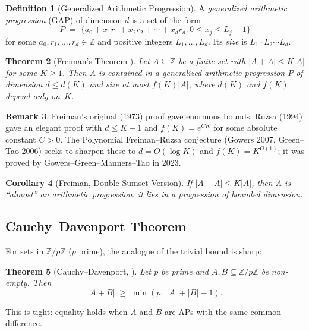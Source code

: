 \documentclass[12pt,a4paper]{amsart}
\newtheorem{theorem}{Theorem}[section]
\newtheorem{corollary}[theorem]{Corollary}
\theoremstyle{definition}
\newtheorem{definition}[theorem]{Definition}
\newtheorem{remark}[theorem]{Remark}
\newcommand{\Z}{\mathbb{Z}}
\newcommand{\abs}[1]{\left|#1\right|}
\begin{document}
\begin{definition}[Generalized Arithmetic Progression]
A \emph{generalized arithmetic progression} (GAP) of dimension $d$ is
a set of the form
\[
  P \;=\; \{a_0 + x_1 r_1 + x_2 r_2 + \cdots + x_d r_d :
             0 \leq x_j \leq L_j - 1\}
\]
for some $a_0, r_1, \ldots, r_d \in \Z$ and positive integers
$L_1, \ldots, L_d$.  Its \emph{size} is $L_1 \cdot L_2 \cdots L_d$.
\end{definition}

\begin{theorem}[Freiman's Theorem \cite{Freiman1973}]\label{thm:freiman}
Let $A \subseteq \Z$ be a finite set with $\abs{A + A} \leq K \abs{A}$
for some $K \geq 1$.  Then $A$ is contained in a generalized arithmetic
progression $P$ of dimension $d \leq d(K)$ and size at most $f(K)\abs{A}$,
where $d(K)$ and $f(K)$ depend only on~$K$.
\end{theorem}

\begin{remark}
Freiman's original (1973) proof gave enormous bounds.  Ruzsa (1994)
gave an elegant proof with $d \leq K - 1$ and $f(K) = e^{CK}$ for some
absolute constant $C > 0$.  The Polynomial Freiman--Ruzsa conjecture
(Gowers 2007, Green--Tao 2006) seeks to sharpen these to
$d = O(\log K)$ and $f(K) = K^{O(1)}$; it was proved by
Gowers--Green--Manners--Tao in 2023.
\end{remark}

\begin{corollary}[Freiman, Double-Sumset Version]
If $\abs{A + A} \leq K\abs{A}$, then $A$ is ``almost'' an arithmetic
progression: it lies in a progression of bounded dimension.
\end{corollary}

\subsection{Cauchy--Davenport Theorem}

For sets in $\Z/p\Z$ ($p$ prime), the analogue of the trivial bound is sharp:

\begin{theorem}[Cauchy--Davenport, \cite{Cauchy1813}]
Let $p$ be prime and $A, B \subseteq \Z/p\Z$ be non-empty.  Then
\[
  \abs{A + B} \;\geq\; \min(p,\; \abs{A} + \abs{B} - 1).
\]
\end{theorem}

This is tight: equality holds when $A$ and $B$ are APs with the same
common difference.
\end{document}
